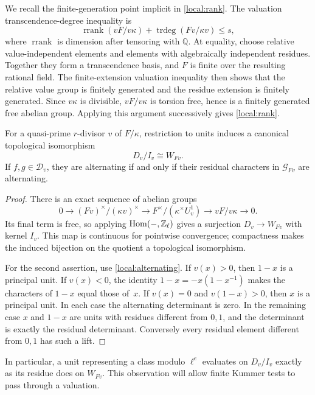 We recall the finite-generation point implicit in
\eqref{local:rank}.  The valuation transcendence-degree inequality is
\begin{equation}\label{local:abhyankar}
 \operatorname{rrank}(vF/v\kappa)
 +\operatorname{trdeg}(Fv/\kappa v)\leq s,
\end{equation}
where $\operatorname{rrank}$ is dimension after tensoring with
$\mathbb Q$.  At equality, choose relative value-independent elements
and elements with algebraically independent residues.  Together they
form a transcendence basis, and $F$ is finite over the resulting
rational field.  The finite-extension valuation inequality then shows
that the relative value group is finitely generated and the residue
extension is finitely generated.  Since $v\kappa$ is divisible,
$vF/v\kappa$ is torsion free, hence is a finitely generated free
abelian group.  Applying this argument successively gives
\eqref{local:rank}.

\begin{lemma}\label{local:residue}
For a quasi-prime $r$-divisor $v$ of $F/\kappa$, restriction to units
induces a canonical topological isomorphism
\[
 D_v/I_v\cong W_{Fv}.
\]
If $f,g\in\mathcal D_v$, they are alternating if and only if their
residual characters in $\mathcal G_{Fv}$ are alternating.
\end{lemma}

\begin{proof}
There is an exact sequence of abelian groups
\[
 0\longrightarrow (Fv)^\times/(\kappa v)^\times
 \longrightarrow F^\times/(\kappa^\times U_v^1)
 \longrightarrow vF/v\kappa\longrightarrow0.
\]
Its final term is free, so applying $\operatorname{Hom}(-,\mathbb Z_\ell)$
gives a surjection $D_v\to W_{Fv}$ with kernel $I_v$.
This map is continuous for pointwise convergence; compactness makes
the induced bijection on the quotient a topological isomorphism.

For the second assertion, use \eqref{local:alternating}.  If $v(x)>0$,
then $1-x$ is a principal unit.  If $v(x)<0$, the identity
$1-x=-x(1-x^{-1})$ makes the characters of $1-x$ equal those of~$x$.
If $v(x)=0$ and $v(1-x)>0$, then $x$ is a principal unit.  In each
case the alternating determinant is zero.  In the remaining case
$x$ and $1-x$ are units with residues different from $0,1$, and the
determinant is exactly the residual determinant.  Conversely every
residual element different from $0,1$ has such a lift.
\end{proof}

In particular, a unit representing a class modulo $\ell^e$ evaluates
on $D_v/I_v$ exactly as its residue does on $W_{Fv}$.  This observation
will allow finite Kummer tests to pass through a valuation.

